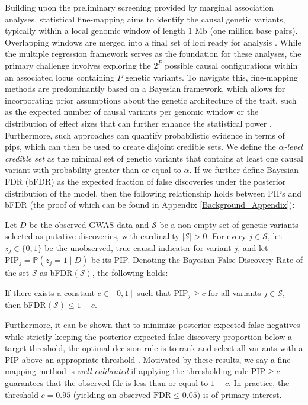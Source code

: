 Building upon the preliminary screening provided by marginal association analyses, statistical fine-mapping aims to identify the causal genetic variants, typically within a local genomic window of length 1 Mb (one million base pairs). Overlapping windows are merged into a final set of loci ready for analysis \cite{FineMappingReview2025}. While the multiple regression framework serves as the foundation for these analyses, the primary challenge involves exploring the $2^P$ possible causal configurations within an associated locus containing $P$ genetic variants. To navigate this, fine-mapping methods are predominantly based on a Bayesian framework, which allows for incorporating prior assumptions about the genetic architecture of the trait, such as the expected number of causal variants per genomic window or the distribution of effect sizes that can further enhance the statistical power \cite{infinitesimalFineMapping2024}. Furthermore, such approaches can quantify probabilistic evidence in terms of \glspl{pip}, which can then be used to create disjoint credible sets. We define the \textit{$\alpha$-level credible set} as the minimal set of genetic variants that contains at least one causal variant with probability greater than or equal to $\alpha$. If we further define Bayesian FDR (bFDR) as the expected fraction of false discoveries under the posterior distribution of the model, then the following relationship holds between PIPs and bFDR (the proof of which can be found in Appendix \ref{Background_Appendix}):

\begin{lemma}
Let $D$ be the observed GWAS data and $\mathcal{S}$ be a non-empty set of genetic variants selected as putative discoveries, with cardinality $|\mathcal{S}| > 0$. For every $j\in \mathcal{S}$, let $z_j \in \{0, 1\}$ be the unobserved, true causal indicator for variant $j$, and let $\text{PIP}_j = \mathbb{P}(z_j = 1 \mid D)$ be its PIP. Denoting the Bayesian False Discovery Rate of the set $\mathcal{S}$ as bFDR$(\mathcal{S})$, the following holds:

If there exists a constant $c \in [0, 1]$ such that $\text{PIP}_j \ge c$ for all variants $j \in \mathcal{S}$, then bFDR$(\mathcal{S}) \le 1 - c$.
\end{lemma}

Furthermore, it can be shown that to minimize posterior expected false negatives while strictly keeping the posterior expected false discovery proportion below a target threshold, the optimal decision rule is to rank and select all variants with a PIP above an appropriate threshold \cite{Muller2004}. Motivated by these results, we say a fine-mapping method is \textit{well-calibrated} if applying the thresholding rule $\text{PIP} \ge c$ guarantees that the observed \gls{fdr} is less than or equal to $1 - c$. In practice, the threshold $c = 0.95$ (yielding an observed $\text{FDR} \le 0.05$) is of primary interest.

